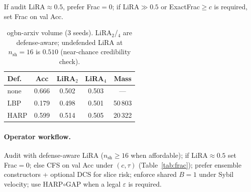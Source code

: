\documentclass[conference]{IEEEtran}
\begin{document}
\begin{table}[!t]
\caption{ogbn-products: standard BFS ladder vs.\ canary-stressed $15$k ($n_{\mathrm{sh}}{=}4$, 3 seeds). Can.\ $=$ canary LiRA.}
\label{tab:products}
\centering
{}
\end{table}
If audit LiRA${\approx}0.5$, prefer Frac${=}0$; if LiRA$\gg 0.5$ or ExactFrac$\ge c$ is required, set Frac on val Acc.

\begin{table}[!t]
\caption{ogbn-arxiv volume (3 seeds). LiRA$_2$/$_4$ are defense-aware; undefended LiRA at $n_{\mathrm{sh}}{=}16$ is $0.510$ (near-chance credibility check).}
\label{tab:canary-ogbn}
\centering
\scriptsize
\begin{tabular}{@{}lcccc@{}}
\toprule
\textbf{Def.} & \textbf{Acc} & \textbf{LiRA$_2$} & \textbf{LiRA$_4$} & \textbf{Mass} \\
\midrule
none & 0.666 & 0.502 & 0.503 & --- \\
LBP & 0.179 & 0.498 & 0.501 & 50\,803 \\
HARP & 0.599 & 0.514 & 0.505 & 20\,322 \\
\bottomrule
\end{tabular}
\end{table}

\paragraph{Operator workflow.}
Audit with defense-aware LiRA ($n_{\mathrm{sh}}{\ge}16$ when affordable); if LiRA${\approx}0.5$ set Frac${=}0$; else CFS on val Acc under $(c,\tau)$ (Table~\ref{tab:frac}); prefer ensemble constructors + optional DCS for slice risk; enforce shared $B{=}1$ under Sybil velocity; use HARP$\circ$GAP when a legal $\varepsilon$ is required.
\end{document}
